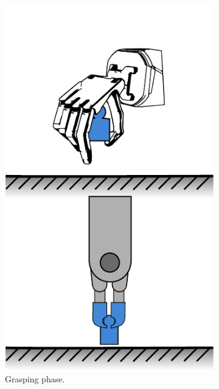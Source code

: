\begin{figure}[h]
\begin{subfigure}[b]{0.24\textwidth}
		\includegraphics[width=\textwidth]{chapters/introduction/fig/pipeline-2.pdf}
		\caption{Grasping phase.\newline}
		\label{fig:grasping-phase}
	\end{subfigure}
	\hfill
	\begin{subfigure}[b]{0.24\textwidth}
		\centering

\end{subfigure}
\end{figure}
